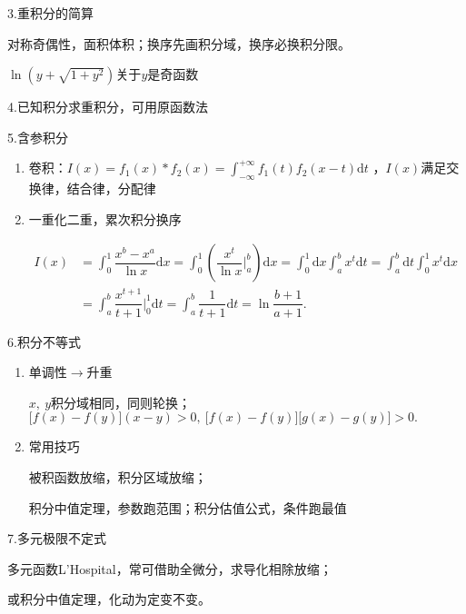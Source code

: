 \documentclass[UTF8]{ctexart}
\newcommand\dif{\mathrm{d}}
\newcommand\no{\noindent}
\newcommand\dis{\displaystyle}
\newcommand\intd{\dis\int}
\begin{document}
\begin{spacing}{2}
\vspace{0.3cm}

\no3.重积分的简算

对称奇偶性，面积体积；换序先画积分域，换序必换积分限。

$\dis\ln\left(y+\sqrt{1+y^2}\right)$关于$y$是奇函数

\no4.已知积分求重积分，可用原函数法

\no5.含参积分

\begin{enumerate}[itemindent=1.4em, label=(\arabic*)]

\item 卷积：$\dis I(x)= f_1(x)*f_2(x)=\intd_{-\infty}^{+\infty}f_1(t)f_2(x-t)\dif t$
，$I(x)$满足交换律，结合律，分配律

\item 一重化二重，累次积分换序

\vspace{0.2cm}

$\begin{aligned}
I(x)&=\intd_0^1\dfrac{x^b-x^a}{\ln x}\dif x
=\intd_0^1\left(\dfrac{x^t}{\ln x}\bigg|_a^b\right)\dif x
=\intd_0^1\dif x\intd_a^bx^t\dif t
=\intd_a^b\dif t\intd_0^1x^t\dif x\\
&=\intd_a^b\dfrac{x^{t+1}}{t+1}\bigg|_0^1\dif t
=\intd_a^b\dfrac{1}{t+1}\dif t
=\ln \dfrac{b+1}{a+1}.
\end{aligned}$

\end{enumerate}

\no6.积分不等式

\begin{enumerate}[itemindent=1.4em, label=(\arabic*)]

\item 单调性$\longrightarrow$升重

$x,\ y$积分域相同，同则轮换；
$\big[f(x)-f(y)\big](x-y)>0,\ \big[f(x)-f(y)\big]\big[g(x)-g(y)\big]>0.$

\item 常用技巧

被积函数放缩，积分区域放缩；

积分中值定理，参数跑范围；积分估值公式，条件跑最值

\end{enumerate}

\no7.多元极限不定式

多元函数L'Hospital，常可借助全微分，求导化相除放缩；

或积分中值定理，化动为定变不变。


\end{spacing}
\end{document}
